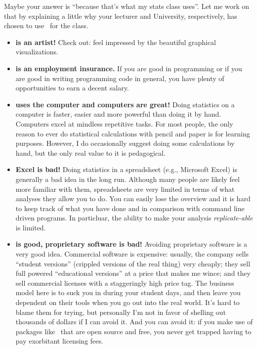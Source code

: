 Maybe your answer is ``because that's what my stats class uses''. Let me work on that by explaining a little why your lecturer and University, respectively, has chosen to use \R\ for the class. 
\begin{itemize}
	\item \textbf{\R is an artist!} Check out:
	feel impressed by the beautiful graphical visualizations.
	\item \textbf{\R is an employment insurance.} If you are good in \R programming or if you are good in writing programming code in general, you have plenty of opportunities to earn a decent salary. 
	\item \textbf{\R uses the computer and computers are great!} Doing statistics on a computer is faster, easier and more powerful than doing it by hand. Computers excel at mindless repetitive tasks. For most people, the only reason to ever do statistical calculations with pencil and paper is for learning purposes. However, I do occasionally suggest doing some calculations by hand, but the only real value to it is pedagogical. 
	\item \textbf{Excel is bad!} Doing statistics in a spreadsheet (e.g., Microsoft Excel) is generally a bad idea in the long run. Although many people are likely feel more familiar with them, spreadsheets are very limited in terms of what analyses they allow you to do. You can easily lose the overview and it is hard to keep track of what you have done and in comparison with command line driven programs. In particluar, the ability to make your analysis \textit{replicate-able} is limited. 
	\item \textbf{\R is good, proprietary software is bad!} Avoiding proprietary software is a very good idea. Commercial software is expensive: usually, the company sells ``student versions'' (crippled versions of the real thing) very cheaply; they sell full powered ``educational versions'' at a price that makes me wince; and they sell commercial licenses with a staggeringly high price tag. The business model here is to suck you in during your student days, and then leave you dependent on their tools when you go out into the real world. It's hard to blame them for trying, but personally I'm not in favor of shelling out thousands of dollars if I can avoid it. And you can avoid it: if you make use of packages like \R\ that are open source and free, you never get trapped having to pay exorbitant licensing fees. 

\end{itemize}
